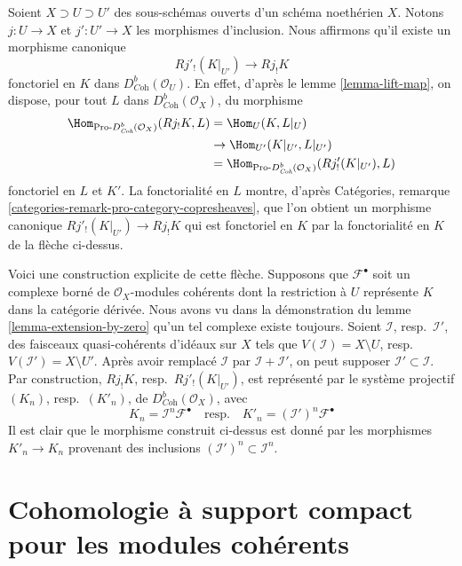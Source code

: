 \begin{remark}
\label{remark-covariance-open-j-lower-shriek}
Soient $X \supset U \supset U'$ des sous-schémas ouverts d'un schéma noethérien $X$. Notons $j : U \to X$ et $j' : U' \to X$ les morphismes d'inclusion. Nous affirmons qu'il existe un morphisme canonique
$$
Rj'_!(K|_{U'}) \longrightarrow Rj_!K
$$
fonctoriel en $K$ dans $D^b_{\textit{Coh}}(\mathcal{O}_U)$. En effet, d'après le lemme \ref{lemma-lift-map}, on dispose, pour tout $L$ dans $D^b_{\textit{Coh}}(\mathcal{O}_X)$, du morphisme
\begin{align*}
\Hom_{\text{Pro-}D^b_{\textit{Coh}}(\mathcal{O}_X)}(Rj_!K, L)
& =
\Hom_U(K, L|_U) \\
& \to
\Hom_{U'}(K|_{U'}, L|_{U'}) \\
& =
\Hom_{\text{Pro-}D^b_{\textit{Coh}}(\mathcal{O}_X)}(Rj'_!(K|_{U'}), L)
\end{align*}
fonctoriel en $L$ et $K'$. La fonctorialité en $L$ montre, d'après Catégories, remarque \ref{categories-remark-pro-category-copresheaves}, que l'on obtient un morphisme canonique $Rj'_!(K|_{U'}) \to Rj_!K$ qui est fonctoriel en $K$ par la fonctorialité en $K$ de la flèche ci-dessus.

\medskip\noindent
Voici une construction explicite de cette flèche. Supposons que $\mathcal{F}^\bullet$ soit un complexe borné de $\mathcal{O}_X$-modules cohérents dont la restriction à $U$ représente $K$ dans la catégorie dérivée. Nous avons vu dans la démonstration du lemme \ref{lemma-extension-by-zero} qu'un tel complexe existe toujours. Soient $\mathcal{I}$, resp.\ $\mathcal{I}'$, des faisceaux quasi-cohérents d'idéaux sur $X$ tels que $V(\mathcal{I}) = X \setminus U$, resp.\ $V(\mathcal{I}') = X \setminus U'$. Après avoir remplacé $\mathcal{I}$ par $\mathcal{I} + \mathcal{I}'$, on peut supposer $\mathcal{I}' \subset \mathcal{I}$. Par construction, $Rj_!K$, resp.\ $Rj'_!(K|_{U'})$, est représenté par le système projectif $(K_n)$, resp.\ $(K'_n)$, de $D^b_{\textit{Coh}}(\mathcal{O}_X)$, avec
$$
K_n = \mathcal{I}^n\mathcal{F}^\bullet
\quad\text{resp.}\quad
K'_n = (\mathcal{I}')^n\mathcal{F}^\bullet
$$
Il est clair que le morphisme construit ci-dessus est donné par les morphismes $K'_n \to K_n$ provenant des inclusions $(\mathcal{I}')^n \subset \mathcal{I}^n$.
\end{remark}






\section{Cohomologie à support compact pour les modules cohérents}
\label{section-compactly-supported}

